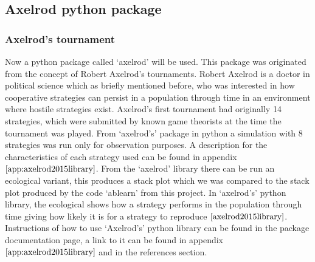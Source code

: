\subsection{Axelrod python package}
\subsubsection{Axelrod's tournament}
Now a python package called `axelrod' will be used. This package was originated from the concept of Robert Axelrod's tournaments. Robert Axelrod is a doctor in political science which as briefly mentioned before, who was interested in how cooperative strategies can persist in a population through time in an environment where hostile strategies exist.
Axelrod’s first tournament had originally 14 strategies, which were submitted by known game theorists at the time the tournament was played. From `axelrod's' package in python a simulation with 8 strategies was run only for observation purposes. A description for the characteristics of each strategy used can be found in appendix $\ref{app:axelrod2015library}$.
From the `axelrod' library there can be run an ecological variant, this produces a stack plot which we was compared to the stack plot produced by the code `ablearn' from this project. In `axelrod's' python library, the ecological shows how a strategy performs in the population through time giving how likely it is for a strategy to reproduce $\cite{axelrod2015library}$. Instructions of how to use `Axelrod's' python library can be found in the package documentation page, a link to it can be found in appendix $\ref{app:axelrod2015library}$ and in the references section.

